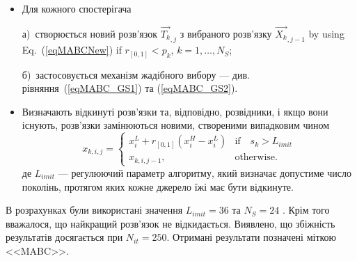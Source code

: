 \begin{itemize}[leftmargin=0cm,itemindent=1em]
 \item Для кожного спостерігача

 а)~створюється новий розв'язок $\overrightarrow{T_{k}}_{,j}$ з вибраного розв'язку
$\overrightarrow{X_{k}}_{,j-1}$ by using Eq.~(\ref{eqMABCNew}) if $r_{[0,1]}<p_k$, $k={1,\ldots,N_S}$;

 б)~застосовується механізм жадібного вибору --- див. рівняння~(\ref{eqMABC_GS1}) та (\ref{eqMABC_GS2}).

 \item
 Визначають відкинуті розв'язки та, відповідно, розвідники, і якщо вони існують, розв'язки замінюються новими, створеними випадковим чином
  \begin{equation}
 \label{eqMABCSC}
 x_{k,i,j}=\left\{
 \begin{array}{ll}
 x_i^L+r_{[0,1]}(x_i^H-x_i^L) & \text{if} \quad s_k>L_{imit}
 \\
 x_{k,i,j-1},& \text{otherwise}.
 \end{array}
 \right.
 \end{equation}
 де
 $L_{imit}$ --- регулюючий параметр алгоритму, який визначає допустиме число поколінь, протягом яких кожне джерело їжі має бути відкинуте.
\end{itemize}

В розрахунках були використані значення $L_{imit}=36$ та $N_S=24$ \cite{MABC}.
Крім того вважалося, що найкращий розв'язок не відкидається.
Виявлено, що збіжність результатів досягається при $N_{it}=250$.
Отримані результати позначені міткою <<MABC>>.

